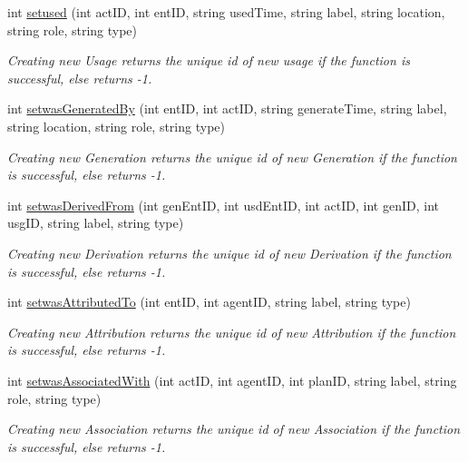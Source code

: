 \begin{DoxyCompactItemize}
int \hyperlink{class_in_di_prov_client_ae33d7a1a44e8d4e7ebbf832271938bce}{setused} (int act\-I\-D, int ent\-I\-D, string used\-Time, string label, string location, string role, string type)
\begin{DoxyCompactList}\small\item\em Creating new Usage returns the unique id of new usage if the function is successful, else returns -\/1. \end{DoxyCompactList}\item 
int \hyperlink{class_in_di_prov_client_a30aa922f818e6a6104185c9a11191acb}{setwas\-Generated\-By} (int ent\-I\-D, int act\-I\-D, string generate\-Time, string label, string location, string role, string type)
\begin{DoxyCompactList}\small\item\em Creating new Generation returns the unique id of new Generation if the function is successful, else returns -\/1. \end{DoxyCompactList}\item 
int \hyperlink{class_in_di_prov_client_afc085d595289e66d9b3928e9a4229051}{setwas\-Derived\-From} (int gen\-Ent\-I\-D, int usd\-Ent\-I\-D, int act\-I\-D, int gen\-I\-D, int usg\-I\-D, string label, string type)
\begin{DoxyCompactList}\small\item\em Creating new Derivation returns the unique id of new Derivation if the function is successful, else returns -\/1. \end{DoxyCompactList}\item 
int \hyperlink{class_in_di_prov_client_ac57311b22c1378f8f542e91c4285f935}{setwas\-Attributed\-To} (int ent\-I\-D, int agent\-I\-D, string label, string type)
\begin{DoxyCompactList}\small\item\em Creating new Attribution returns the unique id of new Attribution if the function is successful, else returns -\/1. \end{DoxyCompactList}\item 
int \hyperlink{class_in_di_prov_client_a1a54aaeb77c6c4cca257999acf42d1e7}{setwas\-Associated\-With} (int act\-I\-D, int agent\-I\-D, int plan\-I\-D, string label, string role, string type)
\begin{DoxyCompactList}\small\item\em Creating new Association returns the unique id of new Association if the function is successful, else returns -\/1. \end{DoxyCompactList}\item 

\end{DoxyCompactItemize}
